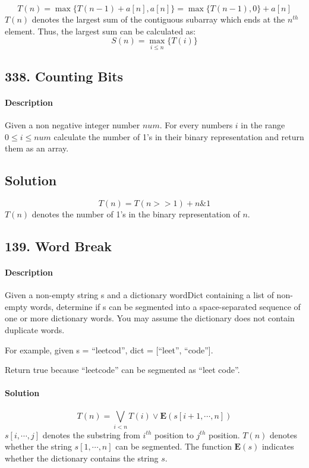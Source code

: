 $$T(n)=\max\{T(n-1)+a[n],a[n]\}=\max\{T(n-1),0\}+a[n]$$
$T(n)$ denotes the largest sum of the contiguous subarray which ends at the $n^{th}$ element. Thus, the largest sum can be calculated as:
$$S(n)=\max_{i\leqslant n}\{T(i)\}$$

\subsection{338. Counting Bits}

\paragraph{Description}

Given a non negative integer number $num$. For every numbers $i$ in the range $0\leqslant i\leqslant num$ calculate the number of 1's in their binary representation and return them as an array.

\subsection{Solution}

$$T(n)=T(n>>1)+n\&1$$
$T(n)$ denotes the number of 1's in the binary representation of $n$.

\subsection{139. Word Break}

\paragraph{Description}

Given a non-empty string s and a dictionary wordDict containing a list of non-empty words, determine if s can be segmented into a space-separated sequence of one or more dictionary words. You may assume the dictionary does not contain duplicate words.

For example, given
s = ``leetcod'',
dict = [``leet'', ``code''].

Return true because ``leetcode'' can be segmented as ``leet code''.

\paragraph{Solution}

$$T(n)=\bigvee\limits_{i<n}{T(i)\vee \bm{E}(s[i+1,\cdots,n])}$$
$s[i,\cdots,j]$ denotes the substring from $i^{th}$ position to $j^{th}$ position. $T(n)$ denotes whether the string $s[1,\cdots,n]$ can be segmented. The function $\bm{E}(s)$ indicates whether the dictionary contains the string $s$.

